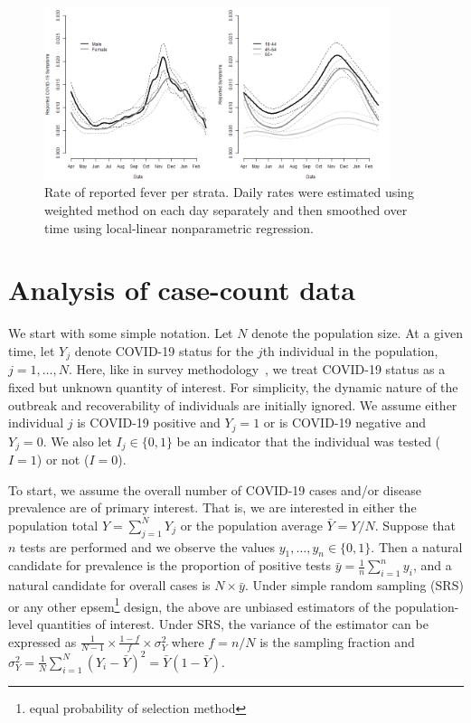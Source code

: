 \documentclass[11pt]{amsart}
\numberwithin{equation}{section}
\theoremstyle{plain}
\begin{document}
\begin{figure}[!th]
\centering
\includegraphics[width = 0.9\textwidth]{../figs/fbcovid19symptoms.png}
\caption{Rate of reported fever per strata.  Daily rates were estimated using weighted method on each day separately and then smoothed over time using local-linear nonparametric regression.}
\label{fig:fbsymptoms}
\vspace{-0.3cm}
\end{figure}


\section{Analysis of case-count data}
\label{section:casecount}

We start with some simple notation.  Let $N$ denote the population size.  At a given time, let $Y_j$ denote COVID-19 status for the $j$th individual in the population, $j=1,\ldots, N$. Here, like in survey methodology~\citep{Cochran77}, we treat COVID-19 status as a fixed but unknown quantity of interest. For simplicity, the dynamic nature of the outbreak and recoverability of individuals are initially ignored.  We assume either individual $j$ is COVID-19 positive and $Y_j=1$ or is COVID-19 negative and $Y_j=0$. We also let $I_j \in \{0,1\}$ be an indicator that the individual was tested ($I = 1$) or not ($I=0$).

To start, we assume the overall number of COVID-19 cases and/or disease prevalence are of primary interest. That is, we are interested in either the population total $Y = \sum_{j=1}^N Y_j$ or the population average $\bar Y = Y/N$. Suppose that $n$ tests are performed and we observe the values $y_1, \ldots, y_n \in \{0,1\}$.  Then a natural candidate for prevalence is the proportion of positive tests $\bar y = \frac{1}{n} \sum_{i=1}^n y_i$, and a natural candidate for overall cases is $N \times \bar y$.
Under simple random sampling (SRS) or any other epsem\footnote{equal probability of selection method} design, the above are unbiased estimators of the population-level quantities of interest.  Under SRS, the variance of the estimator can be expressed as $\frac{1}{N-1} \times \frac{1-f}{f} \times \sigma_Y^2$ where $f = n/N$ is the sampling fraction and $\sigma_Y^2 = \frac{1}{N} \sum_{i=1}^N (Y_i - \bar Y)^2 = \bar Y (1- \bar Y)$.
\end{document}
